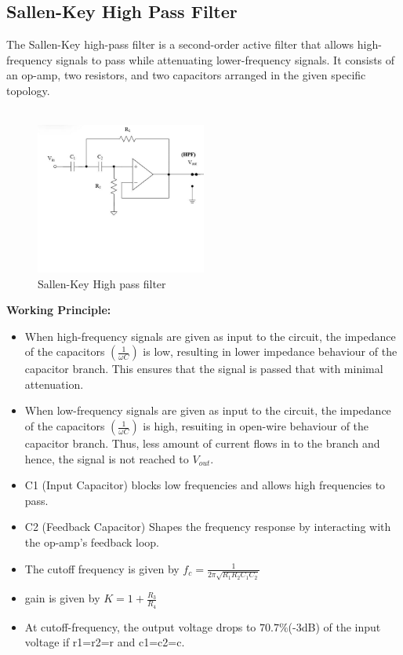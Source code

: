 \documentclass[a4paper,12pt]{article}
\begin{document}
\subsection{Sallen-Key High Pass Filter}
The Sallen-Key high-pass filter is a second-order active filter that allows high-frequency signals to pass while attenuating lower-frequency signals. It consists of an op-amp, two resistors, and two capacitors arranged in the given specific topology.\\\\
\begin{figure}[H]
    \centering
    \includegraphics[width=0.5\textwidth]{fig/hpc.jpeg}
    \caption{Sallen-Key High pass filter}
    \label{fig:yourlabel}
\end{figure}
\textbf{Working Principle:}
\begin{itemize}
    \item When high-frequency signals are given as input to the circuit, the impedance of the capacitors $(\frac{1}{\omega C})$ is low, resulting in lower impedance behaviour of the capacitor branch. This ensures that the signal is passed  that with minimal attenuation. 
    \item When low-frequency signals are given as input to the circuit, the impedance of the capacitors $(\frac{1}{\omega C})$ is high, resuiting in open-wire behaviour of the capacitor branch. Thus, less amount of current flows in to the branch and hence, the signal is not reached to $V_{out}$.
    \item C1 (Input Capacitor) blocks low frequencies and allows high frequencies to pass.
    \item C2 (Feedback Capacitor) Shapes the frequency response by interacting with the op-amp’s feedback loop.
    \item The cutoff frequency is given by $f_c=\frac{1}{2\pi\sqrt{ R_1R_2C_1C_2}}$
    \item gain is given by $K=1+\frac{R_3}{R_4}$
    \item At cutoff-frequency, the output voltage drops to $70.7\%$(-3dB) of the input voltage if r1=r2=r and c1=c2=c.
\end{itemize}
\end{document}
